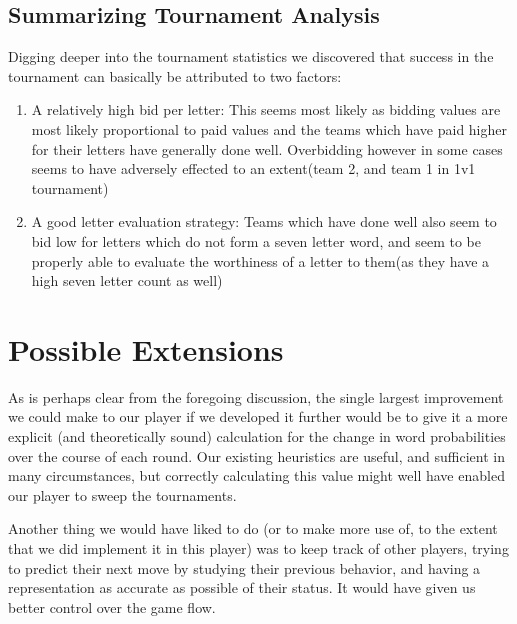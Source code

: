 \documentclass[11pt]{article}
\begin{document}
	\subsection{Summarizing Tournament Analysis}
		
	Digging deeper into the tournament statistics we discovered that success in the tournament can basically be attributed to two factors:

	\begin{enumerate}
	\item{} A relatively high bid per letter: This seems most likely as bidding values are most likely proportional to paid values and the teams which have paid higher for their letters have generally done well. Overbidding however in some cases seems to have adversely effected to an extent(team 2, and team 1 in 1v1 tournament)
	\item{} A good letter evaluation strategy: Teams which have done well also seem to bid low for letters which do not form a seven letter word, and seem to be properly able to evaluate the worthiness of a letter to them(as they have a high seven letter count as well)
\end{enumerate}



\section{Possible Extensions}

As is perhaps clear from the foregoing discussion, the single largest improvement we could make to our player if we developed it further would be to give it a more explicit (and theoretically sound) calculation for the change in word probabilities over the course of each round.  Our existing heuristics are useful, and sufficient in many circumstances, but correctly calculating this value might well have enabled our player to sweep the tournaments.

Another thing we would have liked to do (or to make more use of, to the extent that we did implement it in this player) was to keep track of other players, trying to predict their next move by studying their previous behavior, and having a representation as accurate as possible of their status. It would have given us better control over the game flow.
\end{document}
